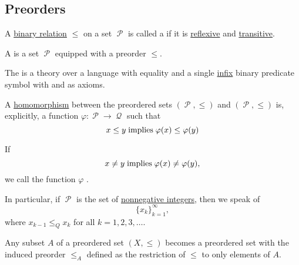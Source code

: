 \subsection{Preorders}\label{subsec:preorders}

\begin{definition}\label{def:preordered_set}
  A \hyperref[def:binary_relation]{binary relation} \( \leq \) on a set \( \mscrP \) is called a  if it is \hyperref[def:binary_relation/reflexive]{reflexive} and \hyperref[def:binary_relation/transitive]{transitive}.

  A  is a set \( \mscrP \) equipped with a preorder \( \leq \).

  \begin{thmenum}[series=def:preordered_set]
     The  is a theory over a language with equality and a single \hyperref[rem:order_infix_notation]{infix} binary predicate symbol with  and  as axioms.

     A \hyperref[def:first_order_homomorphism]{homomorphism} between the preordered sets \( (\mscrP, \leq) \) and \( (\mscrP, \leq) \) is, explicitly, a function \( \varphi: \mscrP \to \mscrQ \) such that
    \begin{equation}\label{eq:def:preordered_set/homomorphism}
      x \leq y \thickspace \text{implies} \thickspace \varphi(x) \leq \varphi(y)
    \end{equation}

    If
    \begin{equation*}
      x \neq y \thickspace \text{implies} \thickspace \varphi(x) \neq \varphi(y),
    \end{equation*}
    we call the function \( \varphi \) .

    In particular, if \( \mscrP \) is the set of \hyperref[rem:peano_arithmetic_zero/nonnegative]{nonnegative integers}, then we speak of 
    \begin{equation*}
      \{ x_k \}_{k=1}^\infty,
    \end{equation*}
    where \( x_{k-1} \leq_Q x_k \) for all \( k = 1, 2, 3, \ldots \).

     Any subset \( A \) of a preordered set \( (X, \leq) \) becomes a preordered set with the induced preorder \( \leq_A \) defined as the restriction of \( \leq \) to only elements of \( A \).


\end{thmenum}
\end{definition}
